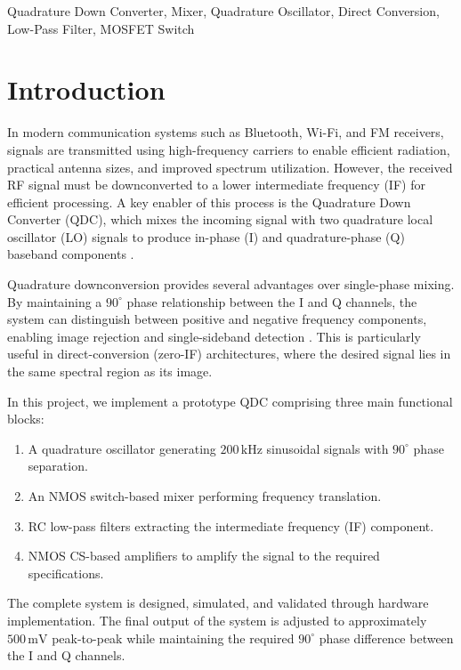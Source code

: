 \documentclass[conference]{IEEEtran}
\begin{document}
\begin{IEEEkeywords}
Quadrature Down Converter, Mixer, Quadrature Oscillator, Direct Conversion, Low-Pass Filter, MOSFET Switch
\end{IEEEkeywords}

\section{Introduction}

In modern communication systems such as Bluetooth, Wi-Fi, and FM receivers, signals are transmitted using high-frequency carriers to enable efficient radiation, practical antenna sizes, and improved spectrum utilization. However, the received RF signal must be downconverted to a lower intermediate frequency (IF) for efficient processing. A key enabler of this process is the Quadrature Down Converter (QDC), which mixes the incoming signal with two quadrature local oscillator (LO) signals to produce in-phase (I) and quadrature-phase (Q) baseband components .

Quadrature downconversion provides several advantages over single-phase mixing. By maintaining a $90^\circ$ phase relationship between the I and Q channels, the system can distinguish between positive and negative frequency components, enabling image rejection and single-sideband detection \cite{razavi2011}. This is particularly useful in direct-conversion (zero-IF) architectures, where the desired signal lies in the same spectral region as its image.

In this project, we implement a prototype QDC comprising three main functional blocks:
\begin{enumerate}
    \item A quadrature oscillator generating $200\,\text{kHz}$ sinusoidal signals with $90^\circ$ phase separation.
    \item An NMOS switch-based mixer performing frequency translation.
    \item RC low-pass filters extracting the intermediate frequency (IF) component.
    \item NMOS CS-based amplifiers to amplify the signal to the required specifications.
\end{enumerate}

The complete system is designed, simulated, and validated through hardware implementation. The final output of the system is adjusted to approximately $500\,\text{mV}$ peak-to-peak while maintaining the required $90^\circ$ phase difference between the I and Q channels.
\end{document}
